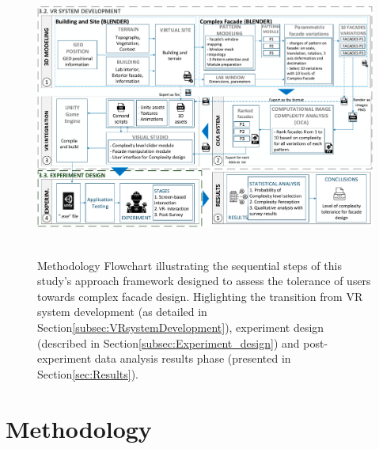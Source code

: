 \documentclass[final,5p,times]{elsarticle}%
\begin{document}
\begin{linenumbers}
            \begin{figure}[!htb]
                \centering
                \includegraphics[width= \linewidth]{Images/MethodologyFlowchart}~\caption{Methodology Flowchart illustrating the sequential steps of this study's approach framework designed to assess the tolerance of users towards complex facade design. Higlighting the transition from VR system development (as detailed in Section\ref{subsec:VRsystemDevelopment}), experiment design (described in Section\ref{subsec:Experiment_design}) and post-experiment data analysis results phase (presented in Section\ref{sec:Results}).}
                  \label{fig:MethodologyFlowchart}
            \end{figure}

\section{Methodology}
\label{sec:Methodology}



\end{linenumbers}
\end{document}
